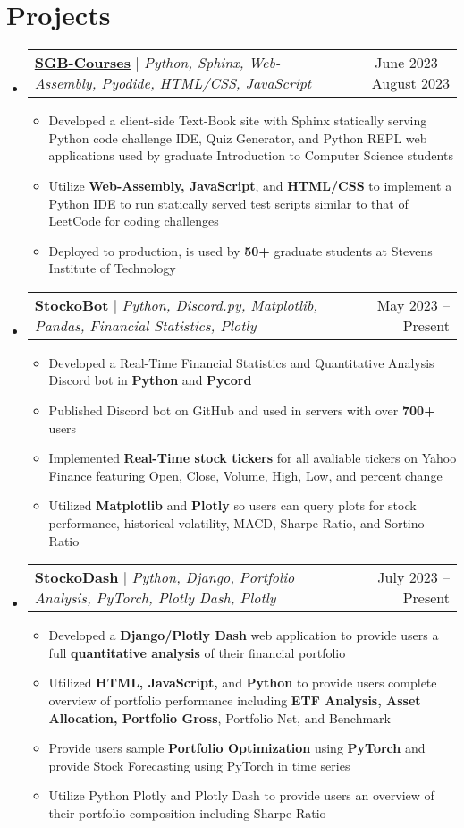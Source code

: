 \documentclass[letterpaper,11pt]{article}
\makeatletter
\newcommand{\resumeItem}[1]{
  \item\small{
    {#1 \vspace{-2pt}}
  }
}
\newcommand{\resumeProjectHeading}[2]{
    \item
    \begin{tabular*}{0.97\textwidth}{l@{\extracolsep{\fill}}r}
      \small#1 & #2 \\
    \end{tabular*}\vspace{-7pt}
}
\newcommand{\resumeSubHeadingListStart}{\begin{itemize}[leftmargin=0.15in, label={}]}
\newcommand{\resumeSubHeadingListEnd}{\end{itemize}}
\newcommand{\resumeItemListStart}{\begin{itemize}}
\newcommand{\resumeItemListEnd}{\end{itemize}\vspace{-5pt}}
\makeatother
\begin{document}
\section{Projects}
    \resumeSubHeadingListStart
      \resumeProjectHeading
          {\textbf{\href{https://etextbook.eric.si/}{SGB-Courses}} $|$ \emph{Python, Sphinx, Web-Assembly, Pyodide, HTML/CSS, JavaScript}}{June 2023 -- August 2023}
          \resumeItemListStart
            \resumeItem{Developed a client-side Text-Book site with Sphinx statically serving Python code challenge IDE, Quiz Generator, and Python REPL web applications used by graduate Introduction to Computer Science students}
            \resumeItem{Utilize \textbf{Web-Assembly, JavaScript}, and \textbf{HTML/CSS} to implement a Python IDE to run statically served test scripts similar to that of LeetCode for coding challenges}
            \resumeItem{Deployed to production, is used by \textbf{50+} graduate students at Stevens Institute of Technology}
          \resumeItemListEnd
      \resumeProjectHeading
          {\textbf{StockoBot} $|$ \emph{Python, Discord.py, Matplotlib, Pandas, Financial Statistics, Plotly}}{May 2023 -- Present}
          \resumeItemListStart
            \resumeItem{Developed a Real-Time Financial Statistics and Quantitative Analysis Discord bot in \textbf{Python} and \textbf{Pycord}}
            \resumeItem{Published Discord bot on GitHub and used in servers with over \textbf{700+} users}
            \resumeItem{Implemented \textbf{Real-Time stock tickers} for all avaliable tickers on Yahoo Finance featuring Open, Close, Volume, High, Low, and percent change}
            \resumeItem{Utilized \textbf{Matplotlib} and \textbf{Plotly} so users can query plots for stock performance, historical volatility, MACD, Sharpe-Ratio, and Sortino Ratio}
          \resumeItemListEnd
      \resumeProjectHeading
          {\textbf{StockoDash} $|$ \emph{Python, Django, Portfolio Analysis, PyTorch, Plotly Dash, Plotly}}{July 2023 -- Present}
          \resumeItemListStart
            \resumeItem{Developed a \textbf{Django/Plotly Dash} web application to provide users a full \textbf{quantitative analysis} of their financial portfolio}
            \resumeItem{Utilized \textbf{HTML, JavaScript,} and \textbf{Python} to provide users complete overview of portfolio performance including \textbf{ETF Analysis, Asset Allocation, Portfolio Gross}, Portfolio Net, and Benchmark}
            \resumeItem{Provide users sample \textbf{Portfolio Optimization} using \textbf{PyTorch} and provide Stock Forecasting using PyTorch in time series}
            \resumeItem{Utilize Python Plotly and Plotly Dash to provide users an overview of their portfolio composition including Sharpe Ratio}
          \resumeItemListEnd
    \resumeSubHeadingListEnd

\end{document}
